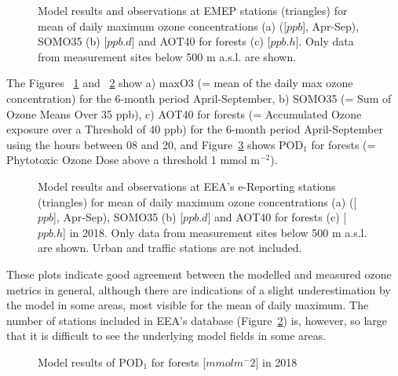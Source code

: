 \begin{figure}[H]
  \centering
\caption{Model results and observations at EMEP stations (triangles) for mean of daily maximum ozone concentrations (a) ([$ppb$], Apr-Sep), SOMO35 (b) [$ppb.d$] and AOT40 for forests (c) [$ppb.h$]. Only data from measurement sites below 500 m a.s.l. are shown.}
\label{fig:indicators_emep}
\end{figure}

The Figures ~\ref{fig:indicators_emep} and ~\ref{fig:indicators_airbase} show a) maxO3 (= mean of the daily max ozone concentration) for the 6-month period April-September, b) SOMO35 (= Sum of Ozone Means Over 35 ppb), c) AOT40 for forests (= Accumulated Ozone exposure over a Threshold of 40 ppb) for the 6-month period April-September using the hours between 08 and 20, and Figure~\ref{fig:indicatorPOD} shows POD$_1$ for forests (= Phytotoxic Ozone Dose above a threshold 1 mmol m$^{-2}$). 

\begin{figure}[H]
  \centering
\caption{Model results and observations at EEA's e-Reporting stations (triangles) for mean of daily maximum ozone concentrations (a) ([$ppb$], Apr-Sep), SOMO35 (b) [$ppb.d$] and AOT40 for forests (c) [$ppb.h$] in 2018. Only data from measurement sites below 500 m a.s.l. are shown. Urban and traffic stations are not included.}
\label{fig:indicators_airbase}
\end{figure}

These plots indicate good agreement between the modelled and measured ozone metrics in general, although there are indications of a slight underestimation by the model in some areas, most visible for the mean of daily maximum. The number of stations included in EEA's database (Figure~\ref{fig:indicators_airbase}) is, however, so large that it is difficult to see the underlying model fields in some areas.

\begin{figure}[H]
\caption{Model results of POD$_1$ for forests [$mmol m^-2$] in 2018}
\label{fig:indicatorPOD}
\end{figure}

